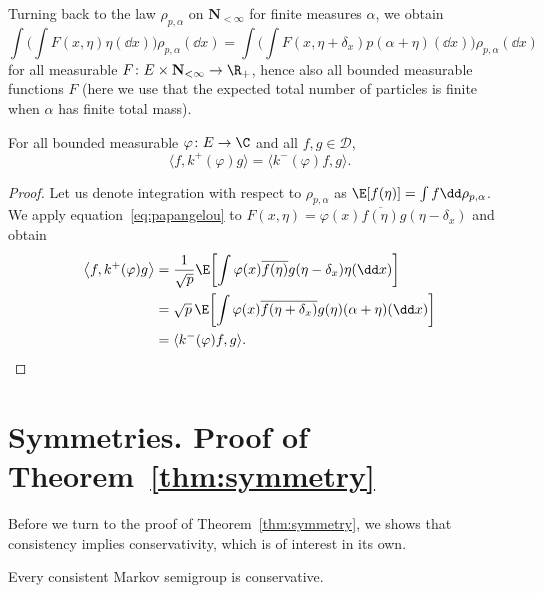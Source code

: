 Turning back to the law $\rho_{p,\alpha}$ on $\mathbf N_{<\infty}$ for finite measures $\alpha$, we obtain
\begin{equation} \label{eq:papangelou}
	\int \biggl( \int F(x,\eta)\eta(\dd x)\biggr) \rho_{p,\alpha}(\dd x)
	= \int\biggl( \int F(x,\eta+\delta_x) p (\alpha+\eta)(\dd x)\biggr) \rho_{p,\alpha}(\dd x)
\end{equation}
for all measurable $F\colon E\times \mathbf N_{<\infty}\to \R_+$, hence also all bounded measurable functions $F$ (here we use that the expected total number of particles is finite when $\alpha$ has finite total mass).

\begin{Lemma} \label{lem:adjoints}
	For all bounded measurable $\varphi\colon E\to \C$ and all $f,g\in \mathcal D$,
	\[
		\bigl\langle f, k^+(\varphi) g\bigr\rangle = \langle k^-(\varphi) f,g \rangle.
	\]
\end{Lemma}

\begin{proof}	
	Let us denote integration with respect to $\rho_{p,\alpha}$ as $\E[f(\eta)] =\int f\dd \rho_{p,\alpha}$. We apply equation~\eqref{eq:papangelou} to $F(x,\eta) = \varphi(x) \overline{f(\eta)} g(\eta - \delta_x)$ and obtain
	\begin{align*}
		\bigl\langle f, k^+(\varphi) g \bigr\rangle
			& = \frac 1{\sqrt p} \E\biggl[\int \varphi(x) \overline{f(\eta)} g(\eta - \delta_x) \eta(\dd x)\biggr]\\
			& = \sqrt p\, \E\biggl[\int \varphi(x) \overline{f(\eta + \delta_x)} g(\eta) (\alpha+ \eta)(\dd x)\biggr]\\
			& = \langle k^-(\varphi) f,g \rangle. \qedhere
\tag*{\qed}
\end{align*}
\renewcommand{\qed}{}
\end{proof}

\section{Symmetries. Proof of Theorem~\ref{thm:symmetry}} \label{sec:symmetry}

Before we turn to the proof of Theorem~\ref{thm:symmetry}, we shows that consistency implies conservativity, which is of interest in its own.

\begin{Proposition}
 \label{proposition: consistency implies conservative}
	Every consistent Markov semigroup is conservative.
\end{Proposition}

